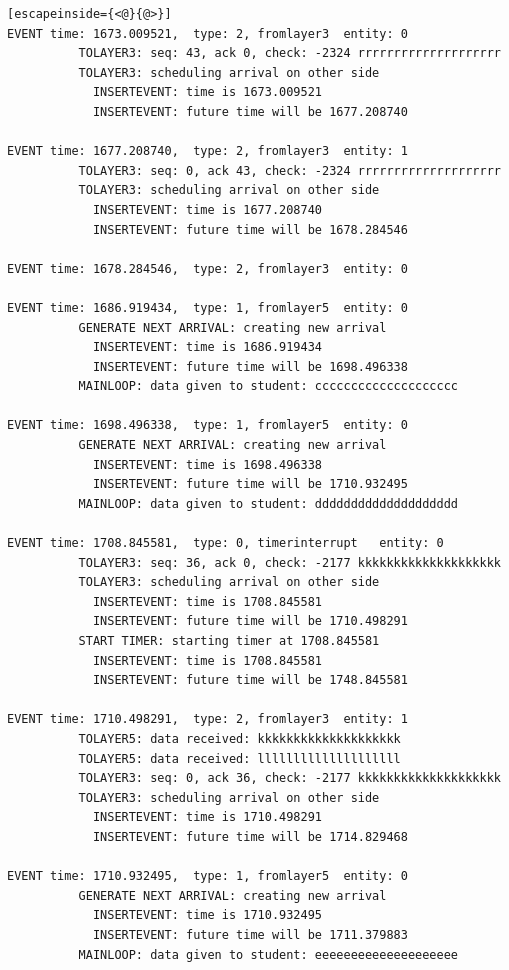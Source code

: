 \documentclass[paper=a4, fontsize=11pt]{scrartcl}
\numberwithin{equation}{section}		%
\numberwithin{figure}{section}			%
\numberwithin{table}{section}				%
\begin{document}
\begin{lstlisting}[escapeinside={<@}{@>}]
EVENT time: 1673.009521,  type: 2, fromlayer3  entity: 0
          TOLAYER3: seq: 43, ack 0, check: -2324 rrrrrrrrrrrrrrrrrrrr
          TOLAYER3: scheduling arrival on other side
            INSERTEVENT: time is 1673.009521
            INSERTEVENT: future time will be 1677.208740

EVENT time: 1677.208740,  type: 2, fromlayer3  entity: 1
          TOLAYER3: seq: 0, ack 43, check: -2324 rrrrrrrrrrrrrrrrrrrr
          TOLAYER3: scheduling arrival on other side
            INSERTEVENT: time is 1677.208740
            INSERTEVENT: future time will be 1678.284546

EVENT time: 1678.284546,  type: 2, fromlayer3  entity: 0

EVENT time: 1686.919434,  type: 1, fromlayer5  entity: 0
          GENERATE NEXT ARRIVAL: creating new arrival
            INSERTEVENT: time is 1686.919434
            INSERTEVENT: future time will be 1698.496338
          MAINLOOP: data given to student: cccccccccccccccccccc

EVENT time: 1698.496338,  type: 1, fromlayer5  entity: 0
          GENERATE NEXT ARRIVAL: creating new arrival
            INSERTEVENT: time is 1698.496338
            INSERTEVENT: future time will be 1710.932495
          MAINLOOP: data given to student: dddddddddddddddddddd

EVENT time: 1708.845581,  type: 0, timerinterrupt   entity: 0
          TOLAYER3: seq: 36, ack 0, check: -2177 kkkkkkkkkkkkkkkkkkkk
          TOLAYER3: scheduling arrival on other side
            INSERTEVENT: time is 1708.845581
            INSERTEVENT: future time will be 1710.498291
          START TIMER: starting timer at 1708.845581
            INSERTEVENT: time is 1708.845581
            INSERTEVENT: future time will be 1748.845581

EVENT time: 1710.498291,  type: 2, fromlayer3  entity: 1
          TOLAYER5: data received: kkkkkkkkkkkkkkkkkkkk
          TOLAYER5: data received: llllllllllllllllllll
          TOLAYER3: seq: 0, ack 36, check: -2177 kkkkkkkkkkkkkkkkkkkk
          TOLAYER3: scheduling arrival on other side
            INSERTEVENT: time is 1710.498291
            INSERTEVENT: future time will be 1714.829468

EVENT time: 1710.932495,  type: 1, fromlayer5  entity: 0
          GENERATE NEXT ARRIVAL: creating new arrival
            INSERTEVENT: time is 1710.932495
            INSERTEVENT: future time will be 1711.379883
          MAINLOOP: data given to student: eeeeeeeeeeeeeeeeeeee


\end{lstlisting}
\end{document}
